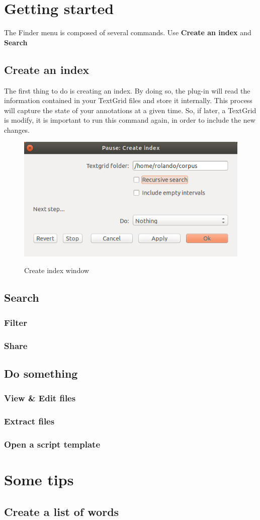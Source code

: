 \documentclass[10pt,a4paper]{article}
\begin{document}
\section{Getting started}
The Finder menu is composed of several commands. Use \textbf{Create an index} and \textbf{Search}
\subsection{Create an index}
The first thing to do is creating an index. By doing so, the plug-in will read the information contained
in your TextGrid files and store it internally.
This process will capture the state of your annotations at a given time. So, if later, a TextGrid is modify, it is important to run this command again, in order to include the new changes.

\begin{figure}
	\centering
	\includegraphics[scale=0.5]{img/001}
	\label{fig:create_index_window}
	\caption{Create index window}
\end{figure}
\subsection{Search}
\subsubsection{Filter}
\subsubsection{Share}
\subsection{Do something}
\subsubsection{View \& Edit files}
\subsubsection{Extract files}
\subsubsection{Open a script template}
\section{Some tips}
\subsection{Create a list of words}
\end{document}
